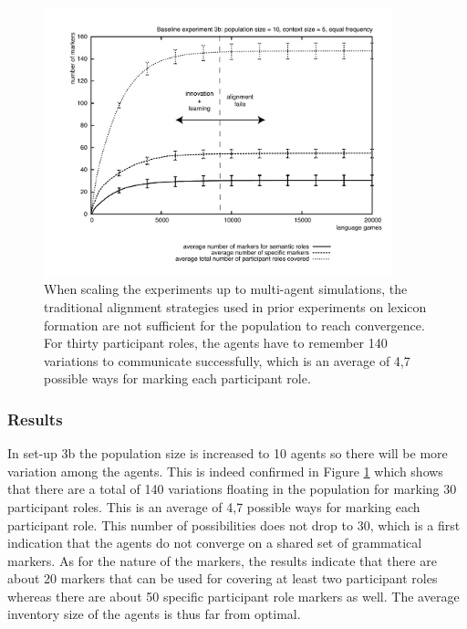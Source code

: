 \begin{figure}[ht]
\centerline{\includegraphics[width=0.9\textwidth]{Chapter3/figs/graph-base3-size3b}}
  \caption[Baseline experiment 3b: number of markers]{When scaling the experiments up to multi-agent simulations, the traditional alignment strategies used in prior experiments on lexicon formation are not sufficient for the population to reach convergence. For thirty participant roles, the agents have to remember 140 variations to communicate successfully, which is an average of 4,7 possible ways for marking each participant role.}
   \label{f:base3-size3b}
\end{figure}

\subsubsection{Results}
 In set-up 3b the population size is increased to 10 agents so there will be more variation among the agents. This is indeed confirmed in Figure \ref{f:base3-size3b} which shows that there are a total of 140 variations floating in the population for marking 30 participant roles. This is an average of 4,7 possible ways for marking each participant role. This number of possibilities does not drop to 30, which is a first indication that the agents do not converge on a shared set of grammatical markers. As for the nature of the markers, the results indicate that there are about 20 markers that can be used for covering at least two participant roles whereas there are about 50 specific participant role markers as well. The average inventory size of the agents is thus far from optimal.

